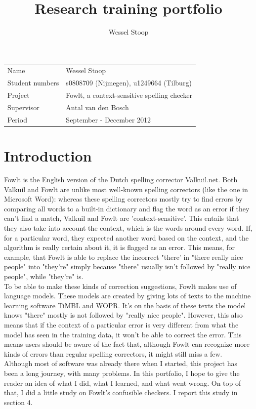 \documentclass[12pt]{article}
\title{Research training portfolio}
\author{Wessel Stoop}
\let\stdsection\section
\renewcommand\section{\newpage\stdsection}
\begin{document}
\maketitle

\begin{table}[h]
\begin{tabular}{ll}
Name&Wessel Stoop\\
Student numbers&s0808709 (Nijmegen), u1249664 (Tilburg)\\
Project&Fowlt, a context-sensitive spelling checker\\
Supervisor&Antal van den Bosch\\
Period&September - December 2012\\
\end{tabular}
\end{table}

\section{Introduction}
Fowlt is the English version of the Dutch spelling corrector Valkuil.net. Both Valkuil and Fowlt are unlike most well-known spelling correctors (like the one in Microsoft Word): whereas these spelling correctors mostly try to find errors by comparing all words to a built-in dictionary and flag the word as an error if they can't find a match, Valkuil and Fowlt are 'context-sensitive'. This entails that they also take into account the context, which is the words around every word. If, for a particular word, they expected another word based on the context, and the algorithm is really certain about it, it is flagged as an error. This means, for example, that Fowlt is able to replace the incorrect "there' in "there really nice people" into "they're" simply because "there" usually isn't followed by "really nice people", while "they're" is. 
\\\indent
To be able to make these kinds of correction suggestions, Fowlt makes use of language models. These models are created by giving lots of texts to the machine learning software TiMBL and WOPR. It's on the basis of these texts the model knows "there" mostly is not followed by "really nice people". However, this also means that if the context of a particular error is very different from what the model has seen in the training data, it won't be able to correct the error. This means users should be aware of the fact that, although Fowlt can recognize more kinds of errors than regular spelling correctors, it might still miss a few. 
\\\indent
Although most of software was already there when I started, this project has been a long journey, with many problems. In this portfolio, I hope to give the reader an idea of what I did, what I learned, and what went wrong. On top of that, I did a little study on Fowlt's confusible checkers. I report this study in section 4.
\\\indent
\end{document}
